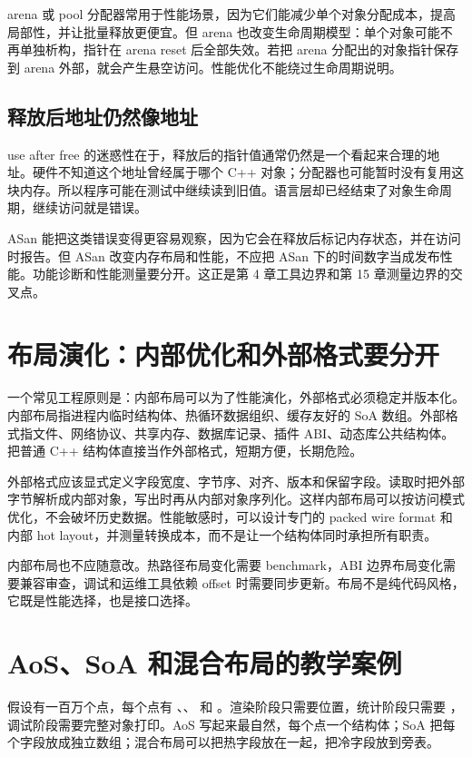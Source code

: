 arena 或 pool 分配器常用于性能场景，因为它们能减少单个对象分配成本，提高局部性，并让批量释放更便宜。但 arena 也改变生命周期模型：单个对象可能不再单独析构，指针在 arena reset 后全部失效。若把 arena 分配出的对象指针保存到 arena 外部，就会产生悬空访问。性能优化不能绕过生命周期说明。

\subsection{释放后地址仍然像地址}

use after free 的迷惑性在于，释放后的指针值通常仍然是一个看起来合理的地址。硬件不知道这个地址曾经属于哪个 C++ 对象；分配器也可能暂时没有复用这块内存。所以程序可能在测试中继续读到旧值。语言层却已经结束了对象生命周期，继续访问就是错误。

ASan 能把这类错误变得更容易观察，因为它会在释放后标记内存状态，并在访问时报告。但 ASan 改变内存布局和性能，不应把 ASan 下的时间数字当成发布性能。功能诊断和性能测量要分开。这正是第 4 章工具边界和第 15 章测量边界的交叉点。

\section{布局演化：内部优化和外部格式要分开}

一个常见工程原则是：内部布局可以为了性能演化，外部格式必须稳定并版本化。内部布局指进程内临时结构体、热循环数据组织、缓存友好的 SoA 数组。外部格式指文件、网络协议、共享内存、数据库记录、插件 ABI、动态库公共结构体。把普通 C++ 结构体直接当作外部格式，短期方便，长期危险。

外部格式应该显式定义字段宽度、字节序、对齐、版本和保留字段。读取时把外部字节解析成内部对象，写出时再从内部对象序列化。这样内部布局可以按访问模式优化，不会破坏历史数据。性能敏感时，可以设计专门的 packed wire format 和内部 hot layout，并测量转换成本，而不是让一个结构体同时承担所有职责。

内部布局也不应随意改。热路径布局变化需要 benchmark，ABI 边界布局变化需要兼容审查，调试和运维工具依赖 offset 时需要同步更新。布局不是纯代码风格，它既是性能选择，也是接口选择。

\section{AoS、SoA 和混合布局的教学案例}

假设有一百万个点，每个点有 、、 和 。渲染阶段只需要位置，统计阶段只需要 ，调试阶段需要完整对象打印。AoS 写起来最自然，每个点一个结构体；SoA 把每个字段放成独立数组；混合布局可以把热字段放在一起，把冷字段放到旁表。

